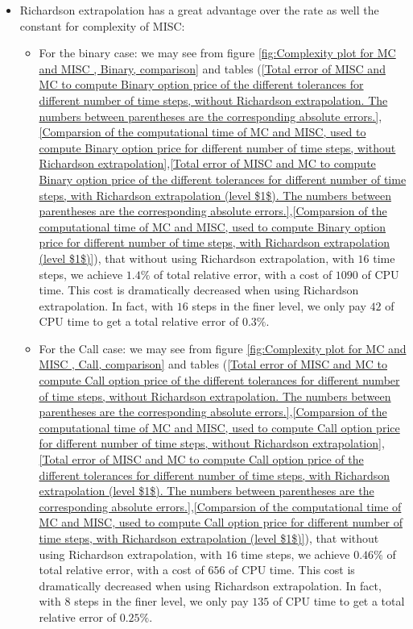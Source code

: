 \documentclass[11pt]{article}
\begin{document}
\begin{itemize}
	\item Richardson extrapolation has a great advantage over the rate as well the constant for complexity of MISC:
	\begin{itemize}
		\item For the binary case: we may see from figure \ref{fig:Complexity plot for MC and MISC , Binary, comparison} and tables (\ref{Total error of MISC and MC to compute Binary option price of the different tolerances for different number of time steps, without Richardson extrapolation. The numbers between parentheses are the corresponding absolute errors.},\ref{Comparsion of the computational time of  MC and MISC, used to compute Binary option price  for different number of time steps, without Richardson extrapolation},\ref{Total error of MISC and MC to compute Binary option price of the different tolerances for different number of time steps, with Richardson extrapolation (level $1$). The numbers between parentheses are the corresponding absolute errors.},\ref{Comparsion of the computational time of  MC and MISC, used to compute Binary option price  for different number of time steps, with Richardson extrapolation (level $1$)}), that without using Richardson extrapolation, with $16$ time steps, we achieve $1.4\%$ of total relative error, with a cost of $1090$ of CPU time. This cost is dramatically decreased when using Richardson extrapolation. In fact, with $16$ steps in the finer level, we only pay   $42$ of CPU time to get a  total relative error of $0.3\%$.
		\item For the Call case: we may see from figure \ref{fig:Complexity plot for MC and MISC , Call, comparison} and tables (\ref{Total error of MISC and MC to compute Call option price of the different tolerances for different number of time steps, without Richardson extrapolation. The numbers between parentheses are the corresponding absolute errors.},\ref{Comparsion of the computational time of  MC and MISC, used to compute Call option price  for different number of time steps, without Richardson extrapolation},\ref{Total error of MISC and MC to compute Call option price of the different tolerances for different number of time steps, with Richardson extrapolation (level $1$). The numbers between parentheses are the corresponding absolute errors.},\ref{Comparsion of the computational time of  MC and MISC, used to compute Call option price  for different number of time steps, with Richardson extrapolation (level $1$)}), that without using Richardson extrapolation, with $16$ time steps, we achieve $0.46\%$ of total relative error, with a cost of $656$ of CPU time. This cost is dramatically decreased when using Richardson extrapolation. In fact, with $8$ steps in the finer level, we only pay   $135$ of CPU time to get a  total relative error of $0.25\%$.
	\end{itemize} 
\end{itemize}
\end{document}
